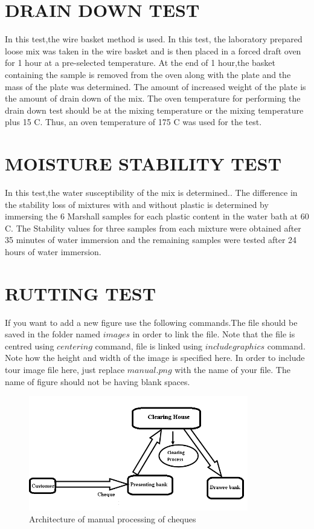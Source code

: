 \section{DRAIN DOWN TEST}
In this test,the wire basket method is used. In this test, the laboratory prepared loose mix was taken in the wire basket and is then placed in a forced draft oven for 1 hour at a pre-selected temperature. At the end of 1 hour,the basket containing the sample is removed from the oven along with the plate and the mass of the plate was determined. The amount of increased weight of the plate is the amount of drain down of the mix. The oven temperature for performing the drain down test should be at the mixing temperature or the mixing temperature plus 15 C. Thus, an oven temperature of 175 C was used for the test.

\section{MOISTURE STABILITY TEST}
\vspace{.5cm}
In this test,the water susceptibility of the mix is determined.. The difference in the stability loss of mixtures with and without plastic is determined by immersing the 6 Marshall samples for each plastic content in the water bath at 60 C. The Stability values for three samples from each mixture were obtained after 35 minutes of water immersion and the remaining samples were tested after 24 hours of water immersion.

\section{RUTTING TEST}
\vspace{.5cm}

If you want to add a new figure use the following commands.The file should be saved in the folder named $images$ in order to link the file. Note that the file is centred using $centering$ command, file is linked using $includegraphics$ command. Note how the height and width of the image is specified here. In order to include tour image file here, just replace $manual.png$ with the name of your file. The name of figure should not be having blank spaces. 

\begin{figure}[H]

\centering
\includegraphics[width=\linewidth,height=5cm] {./images/manual.png}
\caption{Architecture of manual processing of cheques}
\label{manual}
\end{figure}

